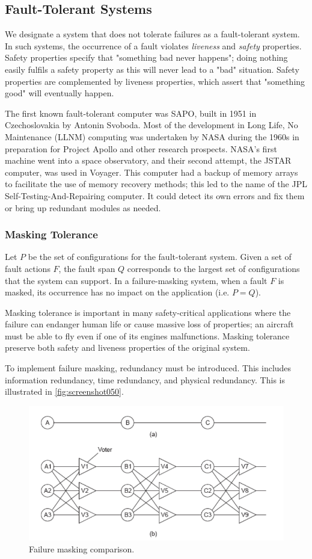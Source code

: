 \subsection{Fault-Tolerant Systems}
We designate a system that does not tolerate failures as a fault-tolerant system. In such systems, the occurrence of a fault violates \textit{liveness} and \textit{safety} properties. Safety properties specify that "something bad never happens"; doing nothing easily fulfils a safety property as this will never lead to a "bad" situation. Safety properties are complemented by liveness properties, which assert that "something good" will eventually happen.

The first known fault-tolerant computer was SAPO, built in 1951 in Czechoslovakia by Antonin Svoboda. Most of the development in Long Life, No Maintenance (LLNM) computing was undertaken by NASA during the 1960s in preparation for Project Apollo and other research prospects. NASA's first machine went into a space observatory, and their second attempt, the JSTAR computer, was used in Voyager. This computer had a backup of memory arrays to facilitate the use of memory recovery methods; this led to the name of the JPL Self-Testing-And-Repairing computer. It could detect its own errors and fix them or bring up redundant modules as needed.

\subsubsection{Masking Tolerance}
Let $P$ be the set of configurations for the fault-tolerant system. Given a set of fault actions $F$, the fault span $Q$ corresponds to the largest set of configurations that the system can support. In a failure-masking system, when a fault $F$ is masked, its occurrence has no impact on the application (i.e. $P = Q$). 

Masking tolerance is important in many safety-critical applications where the failure can endanger human life or cause massive loss of properties; an aircraft must be able to fly even if one of its engines malfunctions. Masking tolerance preserve both safety and liveness properties of the original system. 

To implement failure masking, redundancy must be introduced. This includes information redundancy, time redundancy, and physical redundancy. This is illustrated in \autoref{fig:screenshot050}.
\begin{figure}
\centering
\includegraphics[width=0.7\linewidth]{screenshot050}
\caption{Failure masking comparison.}
\label{fig:screenshot050}
\end{figure}

